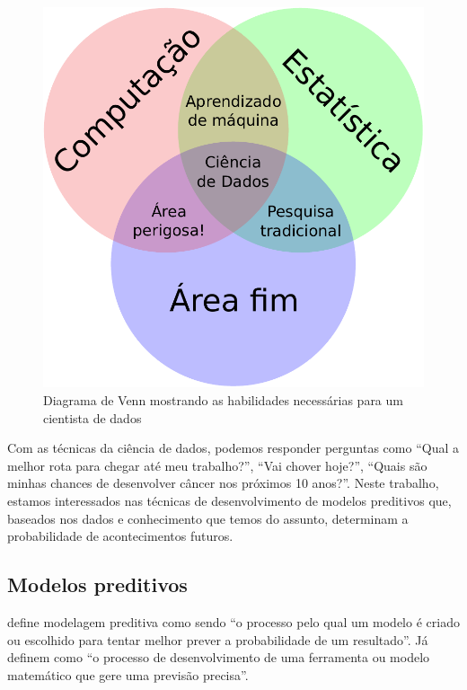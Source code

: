 \documentclass[a4paper,titlepage]{ppgi}\usepackage[]{graphicx}\usepackage[]{color}
\begin{document}
\begin{figure}[h]
\includegraphics{ciencia-de-dados-diagrama-venn}
\caption{Diagrama de Venn mostrando as habilidades necessárias para um
cientista de dados}
\label{fig:ciencia-de-dados-venn}
\end{figure}

Com as técnicas da ciência de dados, podemos responder perguntas como ``Qual a
melhor rota para chegar até meu trabalho?'', ``Vai chover hoje?'', ``Quais são
minhas chances de desenvolver câncer nos próximos 10 anos?''. Neste trabalho,
estamos interessados nas técnicas de desenvolvimento de modelos preditivos que,
baseados nos dados e conhecimento que temos do assunto, determinam a
probabilidade de acontecimentos futuros.

\subsection{Modelos preditivos}

 define modelagem preditiva como sendo ``o processo
pelo qual um modelo é criado ou escolhido para tentar melhor prever a
probabilidade de um resultado''. Já  definem como ``o
processo de desenvolvimento de uma ferramenta ou modelo matemático que gere uma
previsão precisa''.
\end{document}

